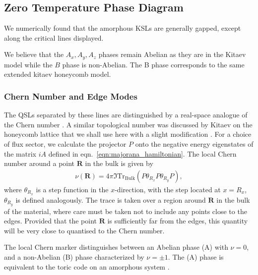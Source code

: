 \hypertarget{zero-temperature-phase-diagram}{%
\subsection{Zero Temperature Phase
Diagram}\label{zero-temperature-phase-diagram}}

We numerically found that the amorphous KSLs are generally gapped,
except along the critical lines displayed.

We believe that the \(A_x, A_y, A_z\) phases remain Abelian as they are
in the Kitaev model while the \(B\) phase is non-Abelian. The B phase
corresponds to the same extended kitaev honeycomb model.

\hypertarget{chern-number-and-edge-modes}{%
\subsubsection{Chern Number and Edge
Modes}\label{chern-number-and-edge-modes}}

The QSLs separated by these lines are distinguished by a real-space
analogue of the Chern number
\autocite{bianco_mapping_2011,Hastings_Almost_2010}. A similar
topological number was discussed by Kitaev on the honeycomb lattice
\autocite{kitaevAnyonsExactlySolved2006} that we shall use here with a
slight modification
\autocite{peru_preprint,mitchellAmorphousTopologicalInsulators2018}. For
a choice of flux sector, we calculate the projector \(P\) onto the
negative energy eigenstates of the matrix \(iA\) defined in
eqn.~\protect\hyperlink{eqn:majorana_hamiltonian}{{[}eqn:majorana\_hamiltonian{]}}.
The local Chern number around a point \(\textbf{R}\) in the bulk is
given by \[\begin{aligned}
    \nu (\textbf{R}) = 4\pi \Im \mathrm{Tr}_{\mathrm{Bulk}} 
    \left ( 
    P\theta_{R_x} P \theta_{R_y} P
    \right ),\end{aligned}\] where \(\theta_{R_x}\) is a step function
in the \(x\)-direction, with the step located at \(x = R_x\),
\(\theta_{R_y}\) is defined analogously. The trace is taken over a
region around \(\textbf{R}\) in the bulk of the material, where care
must be taken not to include any points close to the edges. Provided
that the point \(\textbf{R}\) is sufficiently far from the edges, this
quantity will be very close to quantised to the Chern number.

The local Chern marker distinguishes between an Abelian phase (A) with
\(\nu = 0\), and a non-Abelian (B) phase characterized by
\(\nu = \pm 1\). The (A) phase is equivalent to the toric code on an
amorphous system \autocite{kitaev_fault-tolerant_2003}.

